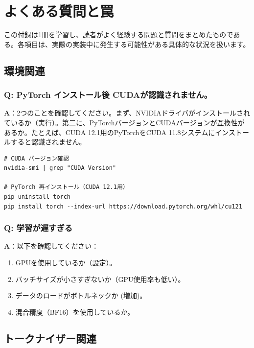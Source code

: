 \chapter{よくある質問と罠}
\label{app:faq}

この付録は1冊を学習し、読者がよく経験する問題と質問をまとめたものである。各項目は、実際の実装中に発生する可能性がある具体的な状況を扱います。

\section{環境関連}

\subsection{Q: PyTorch インストール後 CUDAが認識されません。}

\textbf{A}：2つのことを確認してください。まず、NVIDIAドライバがインストールされているか（実行）。第二に、PyTorchバージョンとCUDAバージョンが互換性があるか。たとえば、CUDA 12.1用のPyTorchをCUDA 11.8システムにインストールすると認識されません。

\begin{lstlisting}[style=bashstyle]
# CUDA バージョン確認
nvidia-smi | grep "CUDA Version"

# PyTorch 再インストール（CUDA 12.1用）
pip uninstall torch
pip install torch --index-url https://download.pytorch.org/whl/cu121
\end{lstlisting}

\subsection{Q: 学習が遅すぎる}

\textbf{A}：以下を確認してください：
\begin{enumerate}
\item GPUを使用しているか（設定）。
\item バッチサイズが小さすぎないか（GPU使用率も低い）。
\item データのロードがボトルネックか (増加)。
\item 混合精度（BF16）を使用しているか。
\end{enumerate}

\section{トークナイザー関連}

